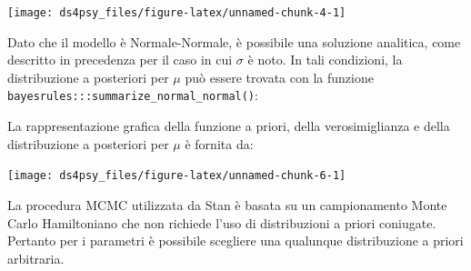\documentclass[
  11pt,
]{krantz}
\makeatletter
\newenvironment{Shaded}{\begin{snugshade}}{\end{snugshade}}
\newcommand{\AttributeTok}[1]{\textcolor[rgb]{0.61,0.61,0.61}{#1}}
\newcommand{\CommentTok}[1]{\textcolor[rgb]{0.37,0.37,0.37}{\textit{#1}}}
\newcommand{\DecValTok}[1]{\textcolor[rgb]{0.06,0.06,0.06}{#1}}
\newcommand{\FunctionTok}[1]{\textcolor[rgb]{0,0,0}{#1}}
\newcommand{\NormalTok}[1]{#1}
\newcommand{\SpecialCharTok}[1]{\textcolor[rgb]{0,0,0}{#1}}
\newenvironment{kframe}{%
\medskip{}
\setlength{\fboxsep}{.8em}
 \def\at@end@of@kframe{}%
 \ifinner\ifhmode%
  \def\at@end@of@kframe{\end{minipage}}%
  \begin{minipage}{\columnwidth}%
 \fi\fi%
 \def\FrameCommand##1{\hskip\@totalleftmargin \hskip-\fboxsep
 \colorbox{shadecolor}{##1}\hskip-\fboxsep
     \hskip-\linewidth \hskip-\@totalleftmargin \hskip\columnwidth}%
 \MakeFramed {\advance\hsize-\width
   \@totalleftmargin\z@ \linewidth\hsize
   \@setminipage}}%
 {\par\unskip\endMakeFramed%
 \at@end@of@kframe}
\renewenvironment{Shaded}{\begin{kframe}}{\end{kframe}}
\theoremstyle{definition}
\theoremstyle{definition}
\theoremstyle{definition}
\theoremstyle{definition}
\theoremstyle{remark}
\makeatother
\begin{document}
\begin{center}\texttt{[image: ds4psy\_files/figure-latex/unnamed-chunk-4-1]} \end{center}

Dato che il modello è Normale-Normale, è possibile una soluzione analitica, come descritto in precedenza per il caso in cui \(\sigma\) è noto. In tali condizioni, la distribuzione a posteriori per \(\mu\) può essere trovata con la funzione \texttt{bayesrules:::summarize\_normal\_normal()}:

\begin{Shaded}
\end{Shaded}

La rappresentazione grafica della funzione a priori, della verosimiglianza e della distribuzione a posteriori per \(\mu\) è fornita da:

\begin{Shaded}
\end{Shaded}

\begin{center}\texttt{[image: ds4psy\_files/figure-latex/unnamed-chunk-6-1]} \end{center}

La procedura MCMC utilizzata da Stan è basata su un campionamento Monte Carlo Hamiltoniano che non richiede l'uso di distribuzioni a priori coniugate. Pertanto per i parametri è possibile scegliere una qualunque distribuzione a priori arbitraria.
\end{document}
